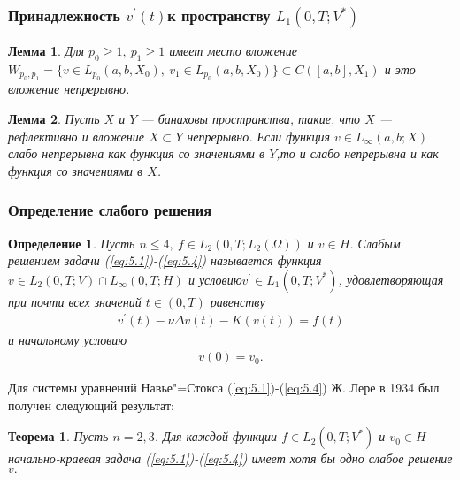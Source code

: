 \documentclass[10pt, pdf, hyperref={unicode}]{beamer}
\newtheorem{ru_theo}{Теорема}
\renewenvironment{theorem}{\begin{ru_theo}}{\end{ru_theo}}
\newtheorem{ru_def}{Определение}
\renewenvironment{definition}{\begin{ru_def}}{\end{ru_def}}
\newtheorem{ru_lemma}{Лемма}
\renewenvironment{lemma}{\begin{ru_lemma}}{\end{ru_lemma}}
\begin{document}
    \begin{frame}
    \frametitle{Принадлежность $v^{\prime} (t)$к пространству $ L_1 (0,T;V^*)$}
    \begin{center}
      \begin{minipage}[h]{0.97\linewidth}
        \begin{lemma}
          Для $p_0\ge 1, \ p_1\ge 1$ имеет место вложение\linebreak
          $W_{p_0,p_1}=\{v\in L_{p_0}(a,b,X_0), \ v_1\in L_{p_0}(a,b,X_0)\}\subset C([a,b],X_1)$
          и это вложение непрерывно.
        \end{lemma}
        \begin{lemma}
          Пусть $X$ и $Y$ --- банаховы пространства, такие, что $X$ --- рефлективно и вложение $X\subset Y$ непрерывно.
          Если функция $v\in L_{\infty}(a,b;X)$ слабо непрерывна как функция со значениями в $Y$,то и слабо непрерывна и как функция со значениями в $X$.
        \end{lemma}
      \end{minipage}
    \end{center}
  \end{frame}

    \begin{frame}
    \frametitle{Определение слабого решения}
    \begin{center}
      \begin{minipage}[h]{0.97\linewidth}
        \begin{definition}
    Пусть $n \le 4, \ f \in L_2(0, T; L_2(\Omega))$ и $v \in H$. Слабым решением задачи (\ref{eq:5.1})-(\ref{eq:5.4}) называется функция
    $v \in L_2(0, T; V)\cap L_{\infty}(0,T;H)$ и условию$ v^{\prime}\in L_1(0, T; V^\ast)$, удовлетворяющая при почти всех значений $t \in (0, T)$ равенству 
    \begin{equation}\label{eq:5.11}
        \begin{gathered}
            v^\prime(t) - \nu\Delta v(t) - K(v(t)) = f(t)
        \end{gathered}
    \end{equation}
      и начальному условию
    \begin{equation}\label{eq:5.12}
        \begin{gathered}
            v(0) = v_0.
        \end{gathered}
    \end{equation}
\end{definition}
Для системы уравнений Навье"=Стокса (\ref{eq:5.1})-(\ref{eq:5.4}) Ж. Лере в 1934 был получен следующий результат:
\begin{theorem}
Пусть $n=2,3$. Для каждой функции $f\in L_2(0,T;V^\ast)$ и $v_0\in H$ начально-краевая задача (\ref{eq:5.1})-(\ref{eq:5.4})
имеет хотя бы одно слабое решение $v.$
\end{theorem}
      \end{minipage}
    \end{center}
  \end{frame}
\end{document}
